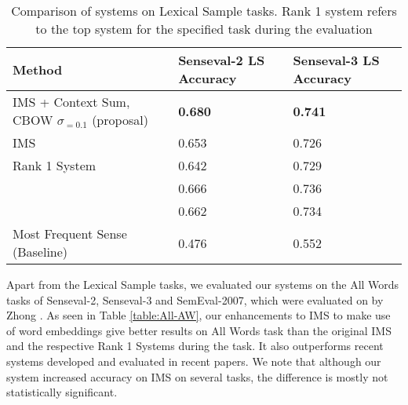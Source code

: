 \begin{table}
	\caption{Comparison of systems on Lexical Sample tasks. Rank 1 system refers to the top system for the specified task during the evaluation}
	\label{table:top-LS}
	\begin{center}
		\begin{tabular}{| p{7cm} | p{4cm} | p{4cm} |}
			\hline
			Method & Senseval-2 LS Accuracy & Senseval-3 LS Accuracy \\
			\hline
			IMS + Context Sum, CBOW $\sigma _{=0.1}$ (proposal) & {\bf0.680} & {\bf0.741} \\
			\hline
			
			IMS & 0.653 & 0.726\\
			\hline
			Rank 1 System & 0.642 & 0.729 \\
			\hline
			\newcite{rothe2015autoextend} & 0.666 & 0.736 \\
			\hline
			\newcite{Taghipour15} & 0.662 & 0.734 \\
			\hline
			Most Frequent Sense (Baseline) & 0.476 & 0.552 \\
			\hline
		\end{tabular}
	\end{center}
\end{table}



Apart from the Lexical Sample tasks, we evaluated our systems on the All Words tasks of Senseval-2, Senseval-3 and SemEval-2007, which were evaluated on by Zhong . As seen in Table \ref{table:All-AW}, our enhancements to IMS to make use of word embeddings give better results on All Words task than the original IMS and the respective Rank 1 Systems during the task. It also outperforms recent systems developed and evaluated in recent papers. We note that although our system increased accuracy on IMS on several
tasks, the difference is mostly not statistically significant. 

